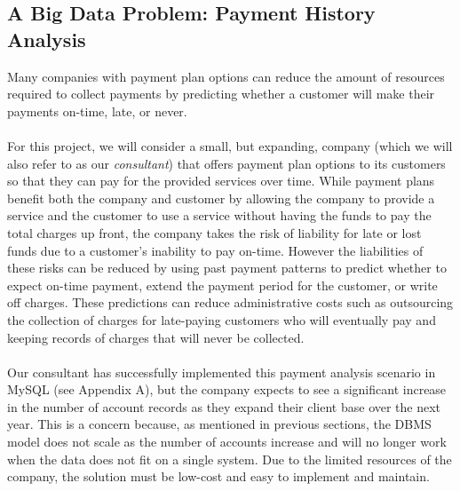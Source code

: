 \documentclass[letterpaper,12pt,titlepage]{article}
\begin{document}
\subsection{A Big Data Problem: Payment History Analysis}
Many companies with payment plan options can reduce the amount of resources
required to collect payments by predicting whether a customer will make their
payments on-time, late, or never. 
\\\\
For this project, we will consider a small, but expanding, company (which we
will also refer to as our \textit{consultant}) that offers payment plan options
to its customers so that they can pay for the provided services over time. While
payment plans benefit both the company and customer by allowing the company to
provide a service and the customer to use a service without having the funds
to pay the total charges up front, the company takes the risk of liability for
late or lost funds due to a customer's inability to pay on-time. However the
liabilities of these risks can be reduced by using past payment patterns to
predict whether to expect on-time payment, extend the payment period for the
customer, or write off charges. These predictions can reduce administrative
costs such as outsourcing the collection of charges for late-paying customers
who will eventually pay and keeping records of charges that will never be
collected. 
\\\\
Our consultant has successfully implemented this payment analysis scenario in
MySQL (see Appendix A), but the company expects to see a significant increase in
the number of account records as they expand their client base over the next
year. This is a concern because, as mentioned in previous sections, the DBMS
model does not scale as the number of accounts increase and will no longer work
when the data does not fit on a single system. Due to the limited resources
of the company, the solution must be low-cost and easy to implement and 
maintain.

\end{document}
